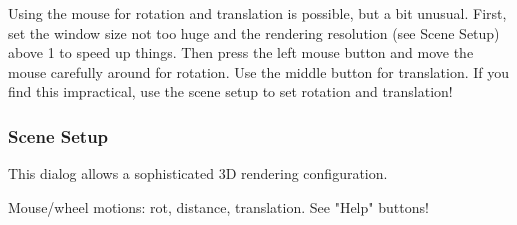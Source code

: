 Using the mouse for rotation and translation is possible, but a bit
unusual. First, set the window size not too huge and the rendering
resolution (see Scene Setup) above 1 to speed up things. Then press
the left mouse button and move the mouse carefully around for
rotation. Use the middle button for translation.  If you find this
impractical, use the scene setup to set rotation and translation!

\subsubsection{Scene Setup}


This dialog allows a sophisticated 3D rendering configuration.

Mouse/wheel motions: rot, distance, translation. See "Help" buttons!


